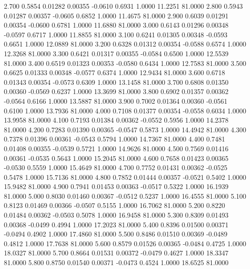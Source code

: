    2.700   0.5854   0.01282   0.00355  -0.0610   0.6931   1.0000  11.2251  81.0000
   2.800   0.5943   0.01287   0.00357  -0.0605   0.6852   1.0000  11.4675  81.0000
   2.900   0.6039   0.01291   0.00354  -0.0600   0.6781   1.0000  11.6880  81.0000
   3.000   0.6143   0.01296   0.00348  -0.0597   0.6717   1.0000  11.8855  81.0000
   3.100   0.6241   0.01305   0.00348  -0.0593   0.6651   1.0000  12.0889  81.0000
   3.200   0.6328   0.01312   0.00354  -0.0588   0.6574   1.0000  12.3268  81.0000
   3.300   0.6421   0.01317   0.00355  -0.0584   0.6500   1.0000  12.5539  81.0000
   3.400   0.6519   0.01323   0.00353  -0.0580   0.6434   1.0000  12.7583  81.0000
   3.500   0.6625   0.01333   0.00348  -0.0577   0.6374   1.0000  12.9434  81.0000
   3.600   0.6718   0.01343   0.00354  -0.0573   0.6309   1.0000  13.1458  81.0000
   3.700   0.6808   0.01350   0.00360  -0.0569   0.6237   1.0000  13.3699  81.0000
   3.800   0.6902   0.01357   0.00362  -0.0564   0.6166   1.0000  13.5887  81.0000
   3.900   0.7002   0.01364   0.00360  -0.0561   0.6100   1.0000  13.7936  81.0000
   4.000   0.7108   0.01377   0.00354  -0.0558   0.6034   1.0000  13.9958  81.0000
   4.100   0.7193   0.01384   0.00362  -0.0552   0.5956   1.0000  14.2378  81.0000
   4.200   0.7283   0.01390   0.00365  -0.0547   0.5873   1.0000  14.4942  81.0000
   4.300   0.7378   0.01396   0.00361  -0.0543   0.5794   1.0000  14.7367  81.0000
   4.400   0.7481   0.01408   0.00355  -0.0539   0.5721   1.0000  14.9626  81.0000
   4.500   0.7569   0.01416   0.00361  -0.0535   0.5643   1.0000  15.2045  81.0000
   4.600   0.7658   0.01423   0.00365  -0.0530   0.5559   1.0000  15.4649  81.0000
   4.700   0.7752   0.01431   0.00362  -0.0525   0.5478   1.0000  15.7136  81.0000
   4.800   0.7852   0.01444   0.00357  -0.0521   0.5402   1.0000  15.9482  81.0000
   4.900   0.7941   0.01453   0.00363  -0.0517   0.5322   1.0000  16.1939  81.0000
   5.000   0.8030   0.01460   0.00367  -0.0512   0.5237   1.0000  16.4555  81.0000
   5.100   0.8123   0.01469   0.00366  -0.0507   0.5155   1.0000  16.7062  81.0000
   5.200   0.8220   0.01484   0.00362  -0.0503   0.5078   1.0000  16.9458  81.0000
   5.300   0.8309   0.01493   0.00368  -0.0499   0.4994   1.0000  17.2023  81.0000
   5.400   0.8396   0.01500   0.00371  -0.0494   0.4902   1.0000  17.4860  81.0000
   5.500   0.8486   0.01510   0.00369  -0.0489   0.4812   1.0000  17.7638  81.0000
   5.600   0.8579   0.01526   0.00365  -0.0484   0.4725   1.0000  18.0327  81.0000
   5.700   0.8664   0.01531   0.00372  -0.0479   0.4627   1.0000  18.3347  81.0000
   5.800   0.8750   0.01540   0.00371  -0.0473   0.4524   1.0000  18.6525  81.0000
